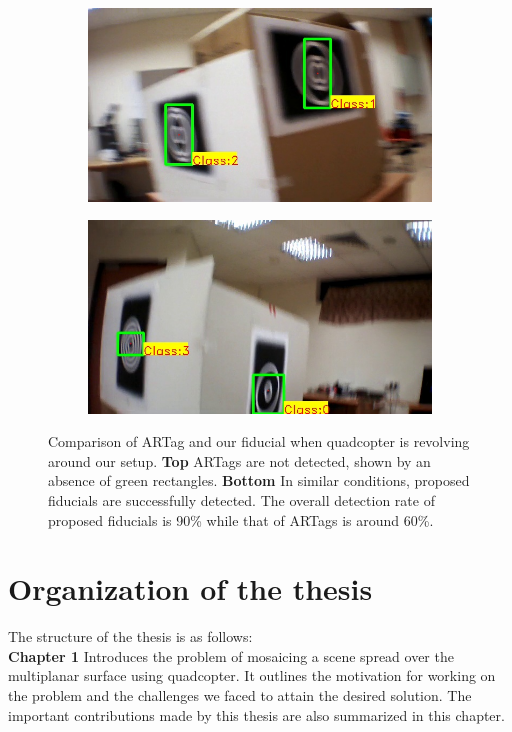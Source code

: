 \begin{figure}
\begin{subfigure}[b]{0.24\textwidth}
\end{subfigure}
\begin{subfigure}[b]{0.24\textwidth}
\includegraphics[width=\linewidth]{figures/fiducial/setup_our/output_2/output_35.jpg}
\end{subfigure}
\begin{subfigure}[b]{0.24\textwidth}
\includegraphics[width=\linewidth]{figures/fiducial/setup_our/output_6/output_943.jpg}
\end{subfigure}
\caption[Comparison of ARTag and our fiducial when quadcopter is
  revolving around our setup]{Comparison of ARTag and our fiducial when quadcopter is
  revolving around our setup. 
\textbf{Top} ARTags are not detected, shown by an absence of green rectangles.
\textbf{Bottom} In similar conditions, proposed fiducials are successfully
detected. The overall detection rate of proposed fiducials is 90\% while that of
ARTags is around 60\%. }
\label{fig:fiducials_result}
\end{figure}
	
\section{Organization of the thesis}
The structure of the thesis is as follows:\\
 \noindent \textbf{Chapter 1} Introduces the problem of mosaicing a scene spread
  over the multiplanar surface using quadcopter. It outlines the motivation for
  working on the problem and the challenges we faced to attain the desired
  solution. The important contributions made by this thesis are also summarized in this chapter.\\

